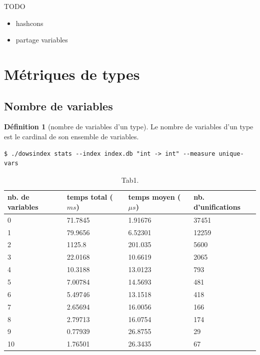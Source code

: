 \documentclass[a4paper]{report}
\theoremstyle{definition}
\newtheorem{definition}[theoreme]{Définition}
\begin{document}
TODO
\begin{itemize}
	\item hashcons
	\item partage variables
\end{itemize}


\section{Métriques de types}


\subsection{Nombre de variables}

\begin{definition}[nombre de variables d'un type]
	Le nombre de variables d'un type est le cardinal de son ensemble de variables.
\end{definition}

\begin{verbatim}
$ ./dowsindex stats --index index.db "int -> int" --measure unique-vars
\end{verbatim}

\begin{table}[h]
	\centering
	\begin{tabular}{|l|l|l|l|}
		\hline
			nb. de variables &
			temps total ($ms$) &
			temps moyen ($\mu s$) &
			nb. d'unifications
		\\
		\hline
			0 & 71.7845 & 1.91676 & 37451
		\\
			1 & 79.9656 & 6.52301 & 12259
		\\
			2 & 1125.8 & 201.035 & 5600
		\\
			3 & 22.0168 & 10.6619 & 2065
		\\
			4 & 10.3188 & 13.0123 & 793
		\\
			5 & 7.00784 & 14.5693 & 481
		\\
			6 & 5.49746 & 13.1518 & 418
		\\
			7 & 2.65694 & 16.0056 & 166
		\\
			8 & 2.79713 & 16.0754 & 174
		\\
			9 & 0.77939 & 26.8755 & 29
		\\
			10 & 1.76501 & 26.3435 & 67
		\\
		\hline
	\end{tabular}
	\caption{\label{tab2} Tab1.}
\end{table}
\end{document}

